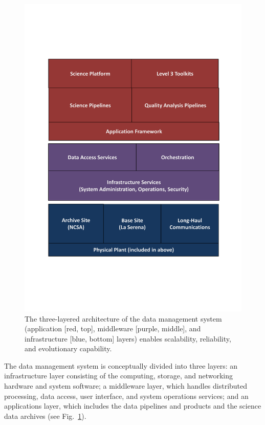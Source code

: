 \begin{figure}
%
%
\hskip -0.2in
\includegraphics[width=1.1\hsize,clip]{DMsandwich.pdf}
\caption{The three-layered architecture of the data management system
(application [red, top], middleware [purple, middle], and infrastructure [blue, bottom] layers) enables scalability, reliability, and evolutionary capability.}
\label{Fig:DM1}
\end{figure}

The data management system is conceptually divided into three layers: an
infrastructure layer consisting of the computing, storage, and
networking hardware and system software; a middleware layer, which
handles distributed processing, data access, user interface, and
system operations services; and an applications layer, which includes
the data pipelines and products and the science data archives (see
Fig.~\ref{Fig:DM1}).


